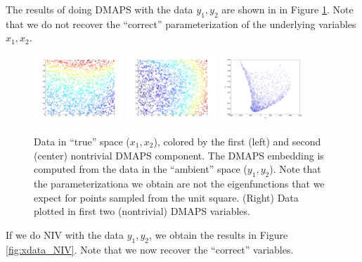 \documentclass[12pt]{article}
\begin{document}
The results of doing DMAPS with the data $y_1, y_2$ are shown in in Figure \ref{fig:xdata_dmaps}.
%
Note that we do not recover the ``correct'' parameterization of the underlying variables $x_1, x_2$.

\begin{figure}[htb]
\includegraphics[width=0.3\textwidth]{xdata_colored_DMAPS1}
\includegraphics[width=0.3\textwidth]{xdata_colored_DMAPS2}
\includegraphics[width=0.3\textwidth]{embedding_dmaps}
\caption{Data in ``true'' space ($x_1, x_2$), colored by the first (left) and second (center) nontrivial DMAPS component. The DMAPS embedding is computed from the data in the ``ambient'' space ($y_1, y_2$). Note that the parameterizationa we obtain are not the eigenfunctions that we expect for points sampled from the unit square. (Right) Data plotted in first two (nontrivial) DMAPS variables.}
\label{fig:xdata_dmaps}
\end{figure}

If we do NIV with the data $y_1, y_2$, 
we obtain the results in Figure \ref{fig:xdata_NIV}.
%
Note that we now recover the ``correct'' variables.
\end{document}
